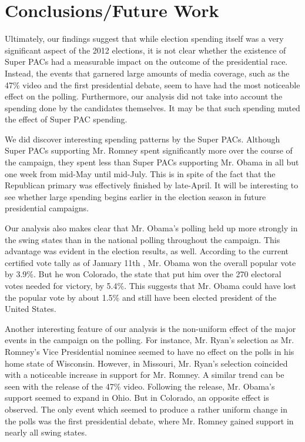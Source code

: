 \documentclass[11pt]{article}\usepackage{graphicx, color}
\begin{document}
\section{Conclusions/Future Work}
Ultimately, our findings suggest that while election spending itself was a very significant aspect of the 2012 elections, it is not clear whether the existence of Super PACs had a measurable impact on the outcome of the presidential race. Instead, the events that garnered large amounts of media coverage, such as the 47\% video and the first presidential debate, seem to have had the most noticeable effect on the polling. Furthermore, our analysis did not take into account the spending done by the candidates themselves. It may be that such spending muted the effect of Super PAC spending.

We did discover interesting spending patterns by the Super PACs. Although Super PACs supporting Mr. Romney spent significantly more over the course of the campaign, they spent less than Super PACs supporting Mr. Obama in all but one week from mid-May until mid-July. This is in spite of the fact that the Republican primary was effectively finished by late-April. It will be interesting to see whether large spending begins earlier in the election season in future presidential campaigns.

Our analysis also makes clear that Mr. Obama's polling held up more strongly in the swing states than in the national polling throughout the campaign. This advantage was evident in the election results, as well. According to the current certified vote tally as of January 11th \cite{dw-vote}, Mr. Obama won the overall popular vote by 3.9\%. But he won Colorado, the state that put him over the 270 electoral votes needed for victory, by 5.4\%. This suggests that Mr. Obama could have lost the popular vote by about 1.5\% and still have been elected president of the United States.

Another interesting feature of our analysis is the non-uniform effect of the major events in the campaign on the polling. For instance, Mr. Ryan's selection as Mr. Romney's Vice Presidential nominee seemed to have no effect on the polls in his home state of Wisconsin. However, in Missouri, Mr. Ryan's selection coincided with a noticeable increase in support for Mr. Romney. A similar trend can be seen with the release of the 47\% video. Following the release, Mr. Obama's support seemed to expand in Ohio. But in Colorado, an opposite effect is observed. The only event which seemed to produce a rather uniform change in the polls was the first presidential debate, where Mr. Romney gained support in nearly all swing states.
\end{document}
